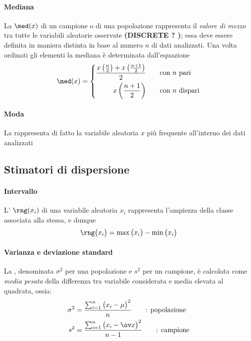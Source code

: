 		\paragraph{Mediana} La  $\med (x)$ di un campione o di una popolazione rappresenta il \textit{valore di mezzo} tra tutte le variabili aleatorie osservate \textbf{(DISCRETE ? )}; essa deve essere definita in maniera distinta in base al numero $n$ di dati analizzati. Una volta ordinati gli elementi la mediana è determinata dall'equazione
		\begin{equation}
			\med (x) = \left\{ \begin{split}
				\frac{x\left(\frac n 2\right) + x\left(\frac{n+1}{2}\right) }{2} \qquad & \textrm{con $n$ pari} \\
				x\left(\frac {n+1} 2\right)  \qquad & \textrm{con $n$ dispari} \\
			\end{split}\right.
		\end{equation}
			
		\paragraph{Moda} La  rappresenta di fatto la variabile aleatoria $x$ più frequente all'interno dei dati analizzati
		
	\subsection{Stimatori di dispersione}
		\paragraph{Intervallo} L' $\rng (x_i)$ di una variabile aleatoria $x_i$ rappresenta l'ampiezza della classe associata alla stessa, e dunque
		\begin{equation}
			\rng \big(x_i\big) = \max \big(x_i\big) -  \min \big(x_i\big)
		\end{equation}
		
		\paragraph{Varianza e deviazione standard} La , denominata $\sigma^2$ per una popolazione e $s^2$ per un campione, è calcolata come \textit{media pesata} della differenza tra variabile considerata e media elevata al quadrata, ossia:
		\begin{equation} \label{eq:stat:varianza}
			\begin{split}
				\sigma^2 &  = \frac{\sum_{i=1}^n \big(x_i-\mu\big)^2}{n} \qquad  \textrm{: popolazione} \\
				s^2 &  = \frac{\sum_{i=1}^n \big(x_i - \ov x\big)^2}{n-1} \qquad \textrm{: campione} 
			\end{split}
		\end{equation}
		
